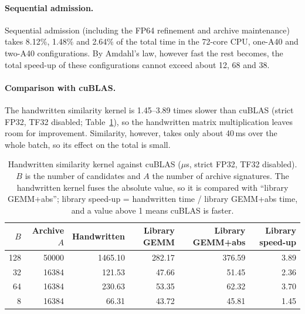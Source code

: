 \documentclass[11pt,a4paper]{article}
\begin{document}
\paragraph{Sequential admission.} Sequential admission (including the FP64 refinement and archive maintenance) takes 8.12\%, 1.48\% and 2.64\% of the total time in the 72-core CPU, one-A40 and two-A40 configurations. By Amdahl's law, however fast the rest becomes, the total speed-up of these configurations cannot exceed about 12, 68 and 38.

\paragraph{Comparison with cuBLAS.} The handwritten similarity kernel is 1.45--3.89 times slower than cuBLAS (strict FP32, TF32 disabled; Table~\ref{tab:cublas}), so the handwritten matrix multiplication leaves room for improvement. Similarity, however, takes only about 40\,ms over the whole batch, so its effect on the total is small.
\begin{table}[H]
\centering\small
\caption{Handwritten similarity kernel against cuBLAS ($\mu$s, strict FP32, TF32 disabled). $B$ is the number of candidates and $A$ the number of archive signatures. The handwritten kernel fuses the absolute value, so it is compared with ``library GEMM+abs''; library speed-up = handwritten time / library GEMM+abs time, and a value above 1 means cuBLAS is faster.}
\label{tab:cublas}
\begin{tabular}{rrrrrr}
\toprule
$B$ & Archive $A$ & Handwritten & Library GEMM & Library GEMM+abs & Library speed-up \\
\midrule
128 & 50000 & 1465.10 & 282.17 & 376.59 & 3.89 \\
32  & 16384 & 121.53  & 47.66  & 51.45  & 2.36 \\
64  & 16384 & 230.63  & 53.35  & 62.32  & 3.70 \\
8   & 16384 & 66.31   & 43.72  & 45.81  & 1.45 \\
\bottomrule
\end{tabular}
\end{table}
\end{document}
